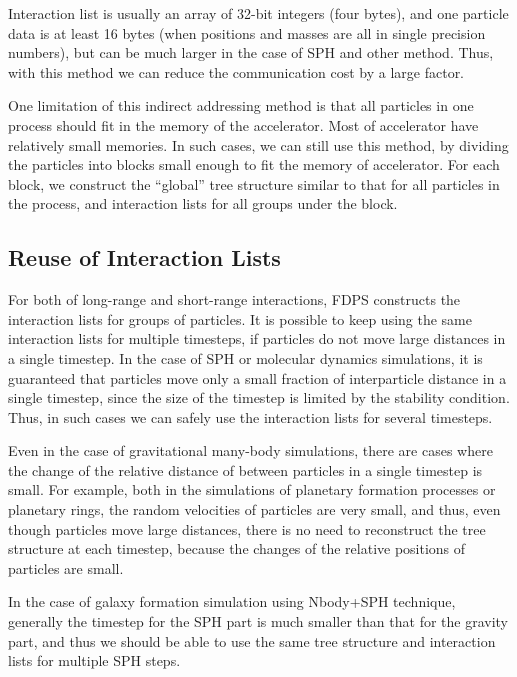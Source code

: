 \documentclass[dvipdfmx]{pasj01}
\begin{document}
Interaction list is usually an array of 32-bit integers (four bytes),
and one particle data is at least 16 bytes (when positions and masses
are all in single precision numbers), but can be much larger in the
case of SPH and other method. Thus, with this method we can reduce the
communication cost by a large factor.

One limitation of this indirect addressing method is that all
particles in one process should fit in the memory of the accelerator.
Most of accelerator have relatively small memories. In such cases, we
can still use this method, by dividing the particles into blocks small
enough to fit the memory of accelerator. For each block, we construct
the ``global'' tree structure similar to that for all particles in the
process, and interaction lists for all groups under the block.

\subsection{Reuse of Interaction Lists}
\label{ref:new_alg_reuse}

For both of long-range and short-range interactions, FDPS constructs
the interaction lists for groups of particles. It is possible to keep
using the same interaction lists for multiple timesteps, if particles
do not move large distances in a single timestep.  In the case of SPH
or molecular dynamics simulations, it is guaranteed that particles
move only a small fraction of interparticle distance in a single
timestep, since the size of the timestep is limited by the stability
condition. Thus, in such cases we can safely use the interaction lists
for several timesteps.

Even in the case of gravitational many-body simulations, there are
cases where the change of the relative distance of between particles
in a single timestep is small. For example, both in the simulations of
planetary formation processes or planetary rings, the random
velocities of particles are very small, and thus, even though
particles move large distances, there is no need to reconstruct the
tree structure at each timestep, because the changes of the relative
positions of particles are small.

In the case of galaxy formation simulation using Nbody+SPH technique,
generally the timestep for the SPH part is much smaller than that for
the gravity part, and thus we should be able to use the same tree
structure and interaction lists for multiple SPH steps.
\end{document}
